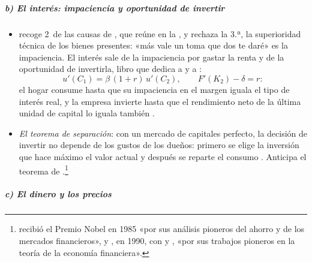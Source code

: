 \documentclass[11pt]{article}
\begin{document}
\subparagraph{b) El interés: impaciencia y oportunidad de invertir}

\begin{itemize}
\item {} recoge 2~de las causas de , que reúne en la , y rechaza la 3.ª, la superioridad técnica de los bienes presentes\nocite{Fisher1907Rate}: «más vale un toma que dos te daré» es la impaciencia. El interés sale de la impaciencia por gastar la renta y de la oportunidad de invertirla\nocite{Fisher1930Theory}, libro que dedica a  y a :
  \begin{equation}
  u'(C_1)=\beta\,(1+r)\,u'(C_2),\qquad F'(K_2)-\delta=r: \label{eq:fisher-interes}
  \end{equation}
  el hogar consume hasta que su impaciencia en el margen iguala el tipo de interés real, y la empresa invierte hasta que el rendimiento neto de la última unidad de capital lo iguala también .
\item \emph{El teorema de separación}: con un mercado de capitales perfecto, la decisión de invertir no depende de los gustos de los dueños: primero se elige la inversión que hace máximo el valor actual y después se reparte el consumo\nocite{Fisher1930Theory,Hirshleifer1958Optimal} . Anticipa el teorema de \textcite{ModiglianiMiller1958Cost}.\footnote{ recibió el Premio Nobel en 1985 «por sus análisis pioneros del ahorro y de los mercados financieros»\nocite{Nobel1985Modigliani}, y , en 1990, con  y , «por sus trabajos pioneros en la teoría de la economía financiera»\nocite{Nobel1990Markowitz}.}
\end{itemize}

\subparagraph{c) El dinero y los precios}
\end{document}
